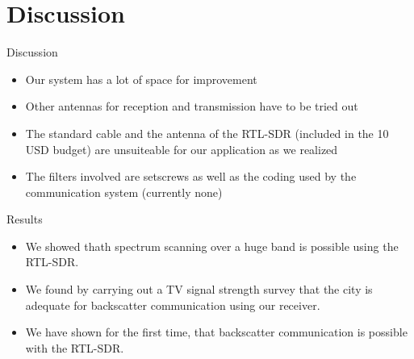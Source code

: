 \documentclass[apectratio=169]{beamer}
\begin{document}
\section{Discussion}

\begin{frame}{Discussion}
	\begin{itemize}
		\item<1-> Our system has a lot of space for improvement
		\item<2-> Other antennas for reception and transmission have to be tried out
		\item<3-> The standard cable and the antenna of the RTL-SDR (included in the 10 USD budget) are unsuiteable for our application as we realized
		\item<4-> The filters involved are setscrews as well as the coding used by the communication system (currently none)
	\end{itemize}
\end{frame}

\begin{frame}{Results}
	\begin{itemize}
		\item<1-> We showed thath spectrum scanning over a huge band is possible using the RTL-SDR.
		\item<2-> We found by carrying out a TV signal strength survey that the city is adequate for backscatter communication using our receiver.
		\item<3-> We have shown for the first time, that backscatter communication is possible with the RTL-SDR.
	\end{itemize}
\end{frame}
\end{document}
